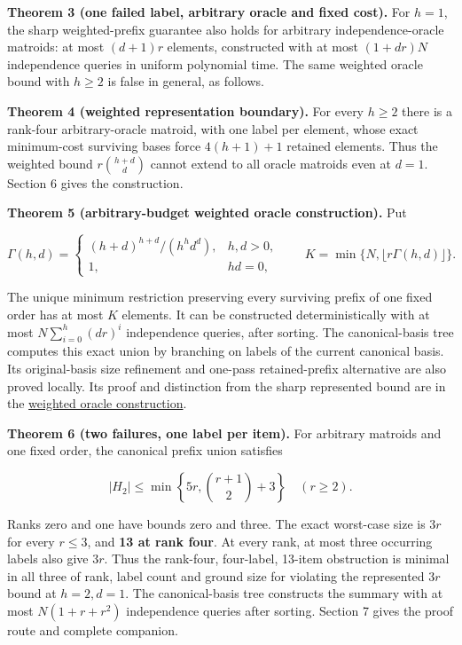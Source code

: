 \textbf{Theorem 3 (one failed label, arbitrary oracle and fixed cost).} For \(h=1\), the sharp weighted-prefix guarantee also holds for arbitrary independence-oracle matroids: at most \((d+1)r\) elements, constructed with at most \((1+dr)N\) independence queries in uniform polynomial time. The same weighted oracle bound with \(h\ge2\) is false in general, as follows.

\textbf{Theorem 4 (weighted representation boundary).} For every \(h\ge2\) there is a rank-four arbitrary-oracle matroid, with one label per element, whose exact minimum-cost surviving bases force \(4(h+1)+1\) retained elements. Thus the weighted bound \(r\binom{h+d}{d}\) cannot extend to all oracle matroids even at \(d=1\). Section 6 gives the construction.

\textbf{Theorem 5 (arbitrary-budget weighted oracle construction).} Put

\[
\Gamma(h,d)=
\begin{cases}
(h+d)^{h+d}/(h^h d^d),&h,d>0,\\
1,&hd=0,
\end{cases}
\qquad K=\min\{N,\lfloor r\Gamma(h,d)\rfloor\}.
\]

The unique minimum restriction preserving every surviving prefix of one fixed order has at most \(K\) elements. It can be constructed deterministically with at most \(N\sum_{i=0}^{h}(dr)^i\) independence queries, after sorting. The canonical-basis tree computes this exact union by branching on labels of the current canonical basis. Its original-basis size refinement and one-pass retained-prefix alternative are also proved locally. Its proof and distinction from the sharp represented bound are in the \href{https://github.com/icekylinx/algorithm-frontier/blob/main/problems/matroid-failure-summaries/manuscripts/weighted-oracle-prefix-fpt-construction.md}{weighted oracle construction}.

\textbf{Theorem 6 (two failures, one label per item).} For arbitrary matroids and one fixed order, the canonical prefix union satisfies

\[
|H_2|\le\min\left\{5r,\binom{r+1}{2}+3\right\}\quad(r\ge2).
\]

Ranks zero and one have bounds zero and three. The exact worst-case size is \(3r\) for every \(r\le3\), and \textbf{13 at rank four}. At every rank, at most three occurring labels also give \(3r\). Thus the rank-four, four-label, 13-item obstruction is minimal in all three of rank, label count and ground size for violating the represented \(3r\) bound at \(h=2,d=1\). The canonical-basis tree constructs the summary with at most \(N(1+r+r^2)\) independence queries after sorting. Section 7 gives the proof route and complete companion.

